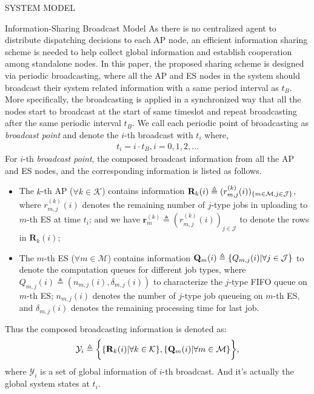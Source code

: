 \documentclass[10pt, conference, letterpaper]{IEEEtran}
\newcommand{\mat}{\mathbf}
\newcommand{\define}{\triangleq}
\renewcommand{\vec}{\mathbf}
\DeclarePairedDelimiter{\set}{\{}{\}}
\DeclarePairedDelimiter{\Brace}{\bigg\{}{\bigg\}}
\newcommand{\apSet}{\mathcal{K}}
\newcommand{\esSet}{\mathcal{M}}
\newcommand{\jSpace}{\mathcal{J}}
\newcommand{\Obsv}{\mathcal{Y}}
\begin{document}
\begin{section}{SYSTEM MODEL}
        \begin{subsection}{Information-Sharing Broadcast Model}
            As there is no centralized agent to distribute dispatching decisions to each AP node, an efficient information sharing scheme is needed to help collect global information and establish cooperation among standalone nodes.
            In this paper, the proposed sharing scheme is designed via periodic broadcasting, where all the AP and ES nodes in the system should broadcast their system related information with a same period interval as $t_B$. More specifically, the broadcasting is applied in a synchronized way that all the nodes start to broadcast at the start of same timeslot and repeat broadcasting after the same periodic interval $t_B$. We call each periodic point of broadcasting as \emph{broadcast point} and denote the $i$-th broadcast with $t_i$ where,
            \begin{align}
                t_i = i \cdot t_B, i=0,1,2,\dots
            \end{align}
            For $i$-th \emph{broadcast point}, the composed broadcast information from all the AP and ES nodes, and the corresponding information is listed as follows.
            \begin{itemize}
                \item The $k$-th AP ($\forall k\in\apSet$) contains information $\mat{R}_k(i) \define (r^{(k)}_{m,j}(i))_{\set{m\in\esSet,j\in\jSpace}}$, where $r^{(k)}_{m,j}(i)$ denotes the remaining number of $j$-type jobs in uploading to $m$-th ES at time $t_i$; and we have $\vec{r}^{(k)}_{m} \define (r^{(k)}_{m,j}(i))_{j\in\jSpace}$ to denote the rows in $\vec{R}_k(i)$; %
                \item The $m$-th ES ($\forall m\in\esSet$) contains information $\vec{Q}_m(i) \define \set{Q_{m,j}(i)|\forall j\in\jSpace}$ to denote the computation queues for different job types, where $Q_{m,j}(i) \define (n_{m,j}(i), \delta_{m,j}(i))$ to characterize the $j$-type FIFO queue on $m$-th ES; $n_{m,j}(i)$ denotes the number of $j$-type job queueing on $m$-th ES, and $\delta_{m,j}(i)$ denotes the remaining processing time for last job.
            \end{itemize}
            Thus the composed broadcasting information is denoted as:
            \begin{align}
                \Obsv_i \define
                        \Brace{
                            \set{\mat{R}_{k}(i)|\forall k\in\apSet},
                            \set{\vec{Q}_m(i)|\forall m\in\esSet}
                        },
            \end{align}
            where $\Obsv_i$ is a set of global information of $i$-th broadcast. And it's actually the global system states at $t_i$.


\end{subsection}
\end{section}
\end{document}
